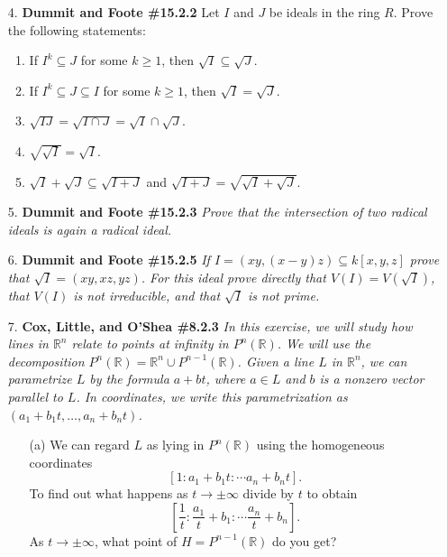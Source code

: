 \documentclass[12pt]{article}
\newcommand{\R}{\mathbb{R}}
\begin{document}
\begin{enumerate}
\item[4.] \textbf{Dummit and Foote \#15.2.2} Let $I$ and $J$ be ideals in the ring $R$. Prove the following statements:
\begin{enumerate}
\item If $I^k\subseteq J$ for some $k\ge 1$, then $\sqrt{I}\subseteq\sqrt{J}$.

\item If $I^k\subseteq J\subseteq I$ for some $k\ge 1$, then $\sqrt{I}=\sqrt{J}$.

\item $\sqrt{IJ} = \sqrt{I\cap J} = \sqrt{I}\cap\sqrt{J}$.

\item $\sqrt{\sqrt{I}} = \sqrt{I}$.

\item $\sqrt{I}+\sqrt{J} \subseteq \sqrt{I+J}$ and $\sqrt{I+J} = \sqrt{\sqrt{I}+\sqrt{J}}$.

\end{enumerate}

\item[5.] \textbf{Dummit and Foote \#15.2.3} \textit{Prove that the intersection of two radical ideals is again a radical ideal.}

\item[6.] \textbf{Dummit and Foote \#15.2.5} \textit{If $I = (xy, (x - y)z) \subseteq k[x, y, z]$ prove that $\sqrt{I} = (xy, xz, yz)$. For this ideal prove
\emph{directly} that $V(I) = V(\sqrt{I})$, that $V(I)$ is not irreducible, and that $\sqrt{I}$ is not prime.}

\item[7.] \textbf{Cox, Little, and O'Shea \#8.2.3} \textit{In this exercise, we will study how lines in $\R^n$ relate to points at infinity in $P^n(\R)$. We will use the decomposition $P^n(\R) = \R^n \cup P^{n-1}(\R)$. Given a line $L$ in $\R^n$, we can parametrize $L$ by the formula $a + bt$, where $a\in L$ and $b$ is a nonzero vector parallel to $L$. In coordinates, we write this parametrization as $(a_1+b_1t,\ldots,a_n+b_nt)$.}

\begin{enumerate}
    \item[(a)] We can regard $L$ as lying in $P^n(\R)$ using the homogeneous coordinates 
    \[
    [1 : a_1 + b_1t : \cdots a_n + b_nt].
    \]
    To find out what happens as $t\to\pm\infty$ divide by $t$ to obtain
    \[
    \left[\frac{1}{t} : \frac{a_1}{t} + b_1 : \cdots \frac{a_n}{t} + b_n\right].
    \]
    As $t\to\pm\infty$, what point of $H=P^{n-1}(\R)$ do you get?


\end{enumerate}
\end{enumerate}
\end{document}
